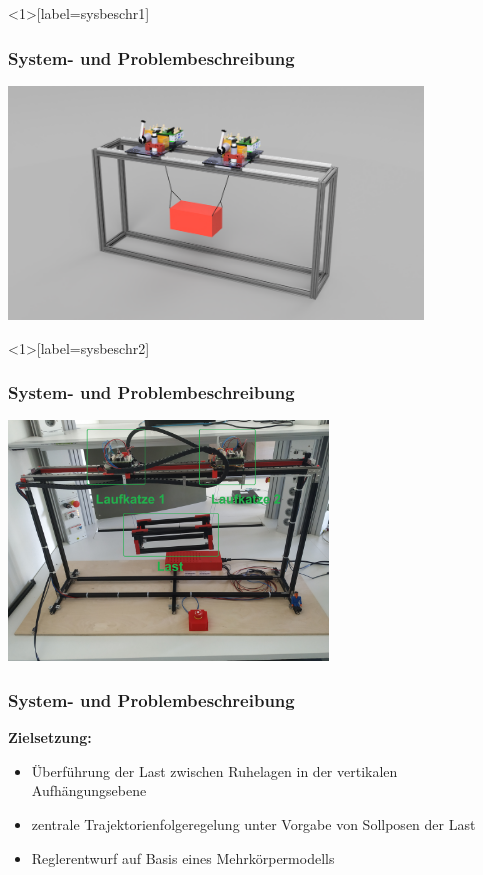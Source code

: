 \documentclass[
	ngerman,
	10pt,				%
	aspectratio=169, 	%
	xcolor=dvipsnames
]{beamer}
\begin{document}

\begin{frame}<1>[label=sysbeschr1]
	\frametitle{System- { und Problembeschreibung}}
	\begin{center}
		\includegraphics[width=110mm]{images/Veritas_demo_CAD}
	\end{center}

\end{frame}


\begin{frame}<1>[label=sysbeschr2]
	\frametitle{System- { und Problembeschreibung}}
	\begin{center}
		\includegraphics[width=85mm]{images/real_gantry}
	\end{center}
	
\end{frame}


\begin{frame}[label=sysbeschr3]
	\frametitle{System- und Problembeschreibung}
	\textbf{Zielsetzung:}
	\begin{itemize}
		\item Überführung der Last zwischen Ruhelagen in der vertikalen Aufhängungsebene
		\pause
		\item zentrale Trajektorienfolgeregelung unter Vorgabe von Sollposen der Last
		\pause
		\item Reglerentwurf auf Basis eines Mehrkörpermodells
	\end{itemize}
\end{frame}
\end{document}
